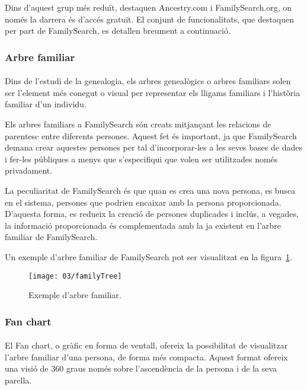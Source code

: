     Dins d’aquest grup més reduït, destaquen Ancestry.com i FamilySearch.org, on només la darrera és d’accés gratuït. El conjunt de funcionalitats, que destaquen per part de FamilySearch, es detallen breument a continuació.


    \subsubsection{Arbre familiar}

    \paragraph{}
    Dins de l’estudi de la genealogia, els arbres genealògics o arbres familiars solen ser l’element més conegut o visual per representar els lligams familiars i l'història familiar d'un individu.

    Els arbres familiars a FamilySearch són creats mitjançant les relacions de parentesc entre diferents persones. Aquest fet és important, ja que FamilySearch demana crear aquestes persones per tal d'incorporar-les a les seves bases de dades i fer-les públiques a menys que s'especifiqui que volen ser utilitzades només privadament.

    La peculiaritat de FamilySearch és que quan es crea una nova persona, es busca en el sistema, persones que podrien encaixar amb la persona proporcionada. D'aquesta forma, es redueix la creació de persones duplicades i inclús, a vegades, la informació proporcionada és complementada amb la ja existent en l'arbre familiar de FamilySearch.

    Un exemple d'arbre familiar de FamilySearch  pot ser visualitzat en la figura~\ref{fig:familyTree}.

    \begin{figure}
        \texttt{[image: 03/familyTree]}
        \centering
        \caption{Exemple d'arbre familiar.\label{fig:familyTree}}
    \end{figure}


    \subsubsection{Fan chart}

    \paragraph{}
    El Fan chart, o gràfic en forma de ventall, ofereix la possibilitat de visualitzar l'arbre familiar d'una persona, de forma més compacta. Aquest format ofereix una visió de 360 graus només sobre l'ascendència de la persona i de la seva parella.

